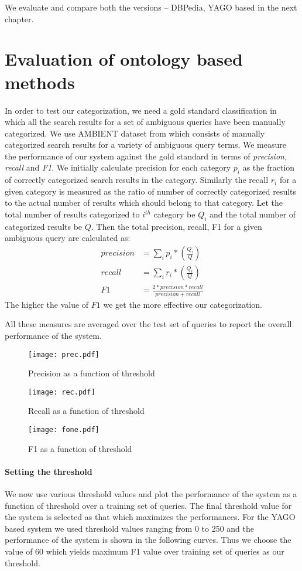 \documentclass[a4paper,12pt]{report}
\begin{document}
We evaluate and compare both the versions -- DBPedia, YAGO based in
the next chapter.

\chapter{Evaluation of ontology based methods}
In order to test our categorization, we need a gold standard
classification in which all the search results for a set of ambiguous
queries have been manually categorized. We use AMBIENT dataset from
\cite{navigli} which consists of manually categorized search results
for a variety of ambiguous query terms. We measure the performance of
our system against the gold standard in terms of {\it precision,
  recall} and {\it F1}. We initially calculate precision for each
category $p_i$ as the fraction of correctly categorized search results
in the category. Similarly the recall $r_i$ for a given category is
measured as the ratio of number of correctly categorized results to
the actual number of results which should belong to that category. Let
the total number of results categorized to $i^{th}$ category be $Q_i$
and the total number of categorized results be $Q$. Then the total
precision, recall, F1 for a given ambiguous query are calculated as:
\begin{align}
precision &= \sum_i p_i * (\frac{Q_i}{Q}) \\
recall &= \sum_i r_i * (\frac{Q_i}{Q}) \\
F1 &= \frac{2*precision*recall}{precision + recall}
\end{align}
The higher the value of $F1$ we get the more effective our
categorization. 

All these measures are averaged over the test set of queries to report
the overall performance of the system.

\begin{figure}[h]
  \centering
  \texttt{[image: prec.pdf]}
  \caption{Precision as a function of threshold}
\end{figure}
\begin{figure}[h]
  \centering
  \texttt{[image: rec.pdf]}
  \caption{Recall as a function of threshold}
\end{figure}
\begin{figure}[h!]
  \centering
  \texttt{[image: fone.pdf]}
  \caption{F1 as a function of threshold}
\end{figure}


\subsubsection{Setting the threshold}
We now use various threshold values and plot the performance of
the system as a function of threshold over a training set of
queries. The final threshold value for the system is selected as that
which maximizes the performances. For the YAGO based system we used
threshold values ranging from 0 to 250 and the performance of the
system is shown in the following curves. Thus we choose the value of
60 which yields maximum F1 value over training set of queries as our
threshold. 
\end{document}
